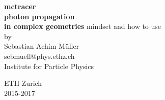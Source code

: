 \documentclass[11pt,a4paper,oneside,titlepage]{book}
\begin{document}
\newcommand{\CppFileStartEnd}[3]{%
    \begin{footnotesize}
    \end{footnotesize}
}

\newcommand{\TxtFile}[1]{%
    \begin{footnotesize}
    \end{footnotesize}
}

\newcommand{\ill}[1]{%
    \begin{lstlisting}#1\end{lstlisting}    
}

\newcommand{\CenFig}[2]{
    \begin{figure}[H]
        \begin{center}
            \texttt{[image: \#1]}
        \end{center}
    \end{figure}
}

\makeatletter
{}
\def\lst@SkipToFirst{%
    \lst@ifmatchrangestart\c@lstnumber=\numexpr-1+\lst@firstline\fi
    \ifnum \lst@lineno<\lst@firstline
        \def\lst@next{\lst@BeginDropInput\lst@Pmode
        \lst@Let{13}\lst@MSkipToFirst
        \lst@Let{10}\lst@MSkipToFirst}%
        \expandafter\lst@next
    \else
        \expandafter\lst@BOLGobble
    \fi}
\makeatother
\newcommand{\tool}{mctracer}
\newcommand{\thetitle}{\tool\\photon propagation\\ in complex geometries}
%
\thispagestyle{empty}
\begin{center}
\Huge\textbf{\thetitle}
%
\vfill
%
\Large
mindset and how to use\\
\vspace{20pt}
\normalsize
{by\\\Large Sebastian Achim M\"uller } \\[5pt]
%
{\normalsize sebmuell@phys.ethz.ch}\\
%
\vspace{20pt}
Institute for Particle Physics
\par\smallskip\noindent
ETH Zurich\\2015-2017
\end{center}
\tableofcontents
\cleardoublepage
%
\setcounter{page}{0}
%
\end{document}
